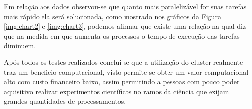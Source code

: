 \documentclass[12pt]{article}
\begin{document}
Em relação aos dados observou-se que quanto mais paralelizável for suas tarefas mais rápido ela será solucionada, como mostrado nos gráficos da Figura \ref{img:chart2} e \ref{img:chart3}, podemos afirmar que existe uma relação na qual diz que na medida em que aumenta os processos o tempo de execução das tarefas diminuem.

Após todos os testes realizados conclui-se que a utilização do cluster realmente traz um beneficio computacional, visto permite-se obter um valor computacional alto com custo financeiro baixo, assim permitindo a pessoas com pouco poder aquisitivo realizar experimentos científicos no ramos da ciência que exijam grandes quantidades de processamentos.




\end{document}

